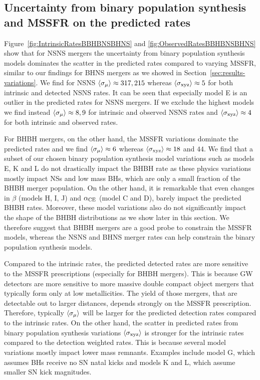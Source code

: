 \documentclass[twocolumn]{aastex63}
\newcommand\bhnsSingle{BHNS\xspace}
\begin{document}
\subsection{Uncertainty from binary population synthesis and \ac{MSSFR} on the predicted rates}
%
Figure~\ref{fig:IntrinsicRatesBBHBNSBHNS} and \ref{fig:ObservedRatesBBHBNSBHNS} show that for \ac{NSNS} mergers the uncertainty from binary population synthesis models dominates  the scatter in the predicted rates compared to varying \ac{MSSFR},  similar to our findings for \bhnsSingle mergers as we showed in Section~\ref{sec:results-variations}. We find for \ac{NSNS}  $\langle \sigma_{\rm{\mu}}\rangle \approx 317, 215$ whereas   $\langle \sigma_{\rm{xyz}}\rangle \approx 5$ for both intrinsic and detected \ac{NSNS} rates.  
It can  be seen that especially model E is an outlier in the predicted rates for \ac{NSNS} mergers.  If we exclude the highest models we find instead $\langle \sigma_{\rm{\mu}}\rangle \approx 8,  9$  for intrinsic and observed \ac{NSNS} rates and   $\langle \sigma_{\rm{xyz}}\rangle \approx 4$ for both intrinsic and observed rates. 

 
For \ac{BHBH} mergers, on the other hand,  the \ac{MSSFR} variations dominate the predicted rates and we find $\langle \sigma_{\rm{\mu}}\rangle \approx 6$ whereas   $\langle \sigma_{\rm{xyz}}\rangle \approx 18$ and $44$.  %
We find that a subset of our chosen binary population synthesis model variations  such as models E, K and L do not drastically impact the \ac{BHBH} rate as these physics variations  mostly impact \acp{NS} and low mass \acp{BH}, which are only a small fraction of the \ac{BHBH} merger population. On the other hand, it is remarkable  that even changes in $\beta$ (models H, I, J) and  $\alpha_{\rm{CE}}$ (model C and D), barely impact the predicted \ac{BHBH} rates. Moreover, these model variations also do not significantly impact the shape of the \ac{BHBH} distributions as we  show later in this section.  We therefore suggest that \ac{BHBH} mergers are a good probe to constrain the \ac{MSSFR} models, whereas the \ac{NSNS} and \bhnsSingle merger rates can help constrain  the binary population synthesis models.

 


%
Compared to the intrinsic rates, the predicted detected rates are more sensitive to the \ac{MSSFR} prescriptions (especially for \ac{BHBH} mergers). This  is because \ac{GW} detectors are more sensitive to more massive double compact object mergers that typically form only at low metallicities. The yield of those mergers, that are detectable out to larger distances, depends strongly on the \ac{MSSFR} prescription. Therefore, typically $\langle \sigma_{\rm{\mu}}\rangle$ will be larger for the predicted detection  rates compared to the intrinsic rates. 
On the other hand, the scatter in predicted rates  from binary population synthesis variations $\langle \sigma_{\rm{xyz}}\rangle$ is stronger for the intrinsic rates compared to the detection weighted rates. This is because several model variations mostly impact lower mass remnants. Examples include model G, which assumes \acp{BH} receive no SN natal kicks and models K and L, which assume smaller SN kick magnitudes. 
\end{document}
